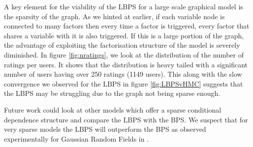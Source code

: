 A key element for the viability of the LBPS for a large scale graphical model is the sparsity of the graph. As we hinted at earlier, if each variable node is connected to many factors then every time a factor is triggered, every factor that shares a variable with it is also triggered. If this is a large portion of the graph, the advantage of exploiting the factorisation structure of the model is severely diminished. 
In figure \ref{fig:nratings}, we look at the distribution of the number of ratings per users. It shows that the distribution is heavy tailed with a significant number of users having over 250 ratings (1149 users). This along with the slow convergence we observed for the LBPS in figure \ref{fig:LBPSvHMC} suggests that the LBPS may be struggling due to the graph not being sparse enough.

Future work could look at other models which offer a sparse conditional dependence structure and compare the LBPS with the BPS. We suspect that for very sparse models the LBPS will outperform the BPS as observed experimentally for Gaussian Random Fields in \citep{bouchard15}. %



